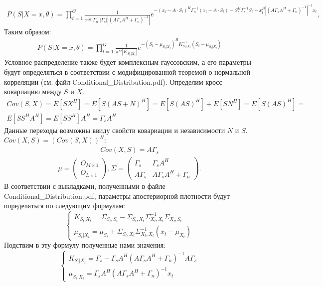 \documentclass[11pt]{article}
\begin{document}
\begin{gather}
P(S|X=x,\theta) = \prod_{t=1}^G \frac{1}{\pi^M |\Gamma_n||\Gamma_s||(A\Gamma_s A^H + \Gamma_n)^{-1}|}e^{-(x_t-A\cdot S_t)^H \Gamma_n^{-1}(x_t-A\cdot S_t)-S_t^H\Gamma_s^{-1}S_t+x_t^H |(A\Gamma_s A^H + \Gamma_n)^{-1}|^{-1}x_t},
\end{gather}
Таким образом:
\begin{gather}
P(S|X=x,\theta) = \prod_{t=1}^G \frac{1}{\pi^M |K_{S_t|X_t}|}e^{-(S_t-\mu_{S_t|X_t})^H K_{S_t|X_t}^{-1} (S_t-\mu_{S_t|X_t})}
\end{gather}
Условное распределение также будет комплексным гауссовским, а его параметры будут определяться в соответствии с модифицированной теоремой о нормальной корреляции (см. файл Conditional\_Distribution.pdf).
Определим кросс-ковариацию между $S$ и $X$.
\begin{equation}
\begin{gathered}
Cov(S,X)=E[SX^H]=E[S(AS+N)^H]=E[S(AS)^H]+E[SN^H]=E[S(AS)^H]=\\E[SS^HA^H]=E[SS^H]A^H=\Gamma_sA^H
\end{gathered}
\end{equation}
Данные переходы возможны ввиду свойств ковариации и независимости $N$ и $S$. $Cov(X,S)=(Cov(S,X))^H$:
\begin{gather}
Cov(X,S) = A\Gamma_s
\end{gather}
\begin{gather}
\mu = \begin{pmatrix}
O_{M\times1}\\
O_{L\times1}
\end{pmatrix},
\Sigma = \begin{pmatrix}
\Gamma_s&\Gamma_sA^H\\
A\Gamma_s&A\Gamma_sA^H+\Gamma_n
\end{pmatrix}.
\end{gather}
В соответствии с выкладками, полученными в файле  Conditional\_Distribution.pdf, параметры апостериорной плотности будут определяться по следующим формулам:
\begin{equation}
\left\{ \begin{gathered} 
K_{S_t|X_t} = \Sigma_{S_t,S_t}-\Sigma_{S_t,X_t}\Sigma_{X_t,X_t}^{-1}\Sigma_{X_t,S_t} \\
\mu_{S_t|X_t} = \mu_{S_t} + \Sigma_{S_t,X_t}\Sigma_{X_t,X_t}^{-1}(x_t-\mu_{X_t})
\end{gathered} \right.
\end{equation}
Подствим в эту формулу полученные нами значения:
\begin{equation}
\left\{ \begin{gathered} 
K_{S_t|X_t} = \Gamma_s-\Gamma_sA^H(A\Gamma_sA^H+\Gamma_n)^{-1}A\Gamma_s \\
\mu_{S_t|X_t} = \Gamma_sA^H(A\Gamma_sA^H+\Gamma_n)^{-1} x_t
\end{gathered} \right.
\end{equation}
\end{document}
